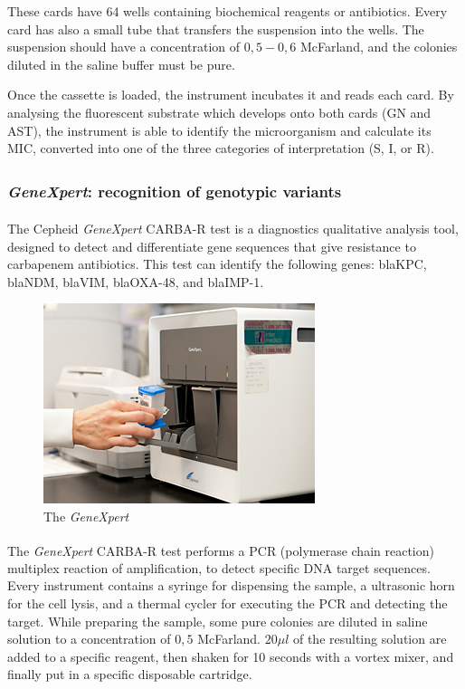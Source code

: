 \documentclass[11pt]{report}
\begin{document}
These cards have 64 wells containing biochemical reagents or antibiotics.
Every card has also a small tube that transfers the suspension into the wells.
The suspension should have a concentration of $0,5-0,6$ McFarland, and the colonies diluted in the saline buffer must be pure.

Once the cassette is loaded, the instrument incubates it and reads each card.
By analysing the fluorescent substrate which develops onto both cards (GN and AST), the instrument is able to identify the microorganism and calculate its MIC, converted into one of the three categories of interpretation (S, I, or R).

\subsubsection{\emph{GeneXpert}\textsuperscript{\textregistered}: recognition of genotypic variants}
The Cepheid \emph{GeneXpert}\textsuperscript{\textregistered} CARBA-R test is a diagnostics qualitative analysis tool, designed to detect and differentiate gene sequences that give resistance to carbapenem antibiotics.
This test can identify the following genes: blaKPC, blaNDM, blaVIM, blaOXA-48, and blaIMP-1.

\begin{figure}[htp]
\centering
\includegraphics[scale=1.00]{img/genexpert.jpg}
\caption{The \emph{GeneXpert}}
\label{}
\end{figure}

The \emph{GeneXpert}\textsuperscript{\textregistered} CARBA-R test performs a PCR (polymerase chain reaction) multiplex reaction of amplification, to detect specific DNA target sequences.
Every instrument contains a syringe for dispensing the sample, a ultrasonic horn for the cell lysis, and a thermal cycler for executing the PCR and detecting the target.
While preparing the sample, some pure colonies are diluted in saline solution to a concentration of $0,5$ McFarland.
$20\mu l$ of the resulting solution are added to a specific reagent, then shaken for 10 seconds with a vortex mixer, and finally put in a specific disposable cartridge.
\end{document}
